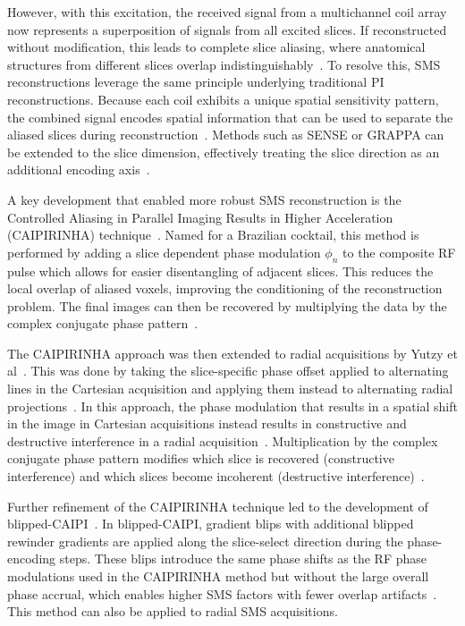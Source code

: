 However, with this excitation, the received signal from a multichannel coil array now represents a superposition of signals from all excited slices. If reconstructed without modification, this leads to complete slice aliasing, where anatomical structures from different slices overlap indistinguishably~\cite{barthSimultaneousMultisliceSMS2016a}. To resolve this, SMS reconstructions leverage the same principle underlying traditional PI reconstructions. Because each coil exhibits a unique spatial sensitivity pattern, the combined signal encodes spatial information that can be used to separate the aliased slices during reconstruction~\cite{barthSimultaneousMultisliceSMS2016a}. Methods such as SENSE or GRAPPA can be extended to the slice dimension, effectively treating the slice direction as an additional encoding axis~\cite{blaimerSMASHSENSEPILS2004,barthSimultaneousMultisliceSMS2016a}.

A key development that enabled more robust SMS reconstruction is the Controlled Aliasing in Parallel Imaging Results in Higher Acceleration (CAIPIRINHA) technique~\cite{breuerControlledAliasingParallel2005}. Named for a Brazilian cocktail, this method is performed by adding a slice dependent phase modulation $\phi_n$ to the composite RF pulse which allows for easier disentangling of adjacent slices. This reduces the local overlap of aliased voxels, improving the conditioning of the reconstruction problem. The final images can then be recovered by multiplying the data by the complex conjugate phase pattern~\cite{breuerControlledAliasingParallel2005,barthSimultaneousMultisliceSMS2016a}.

The CAIPIRINHA approach was then extended to radial acquisitions by Yutzy et al~\cite{yutzyImprovementsMultisliceParallel2011a}. This was done by taking the slice-specific phase offset applied to alternating lines in the Cartesian acquisition and applying them instead to alternating radial projections~\cite{breuerControlledAliasingParallel2005,yutzyImprovementsMultisliceParallel2011a}. In this approach, the phase modulation that results in a spatial shift in the image in Cartesian acquisitions instead results in constructive and destructive interference in a radial acquisition~\cite{yutzyImprovementsMultisliceParallel2011a}. Multiplication by the complex conjugate phase pattern modifies which slice is recovered (constructive interference) and which slices become incoherent (destructive interference)~\cite{yutzyImprovementsMultisliceParallel2011a}.

Further refinement of the CAIPIRINHA technique led to the development of blipped-CAIPI~\cite{setsompopBlippedControlledAliasingParallel2012a}. In blipped-CAIPI, gradient blips with additional blipped rewinder gradients are applied along the slice-select direction during the phase-encoding steps. These blips introduce the same phase shifts as the RF phase modulations used in the CAIPIRINHA method but without the large overall phase accrual, which enables higher SMS factors with fewer overlap artifacts~\cite{setsompopBlippedControlledAliasingParallel2012a}. This method can also be applied to radial SMS acquisitions.

